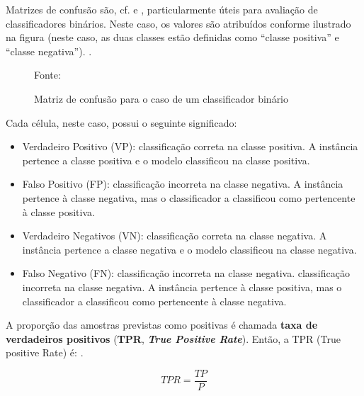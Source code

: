 Matrizes de confusão são, cf.  e , particularmente úteis para avaliação de classificadores binários. Neste caso, os valores são atribuídos conforme ilustrado na figura (neste caso, as duas classes estão definidas como ``classe positiva'' e ``classe negativa''). \cite{hossin_review_2015}.

\begin{figure}[h!]
	\centering
	\caption{Matriz de confusão para o caso de um classificador binário}
	
	{\scriptsize Fonte: }
	\label{fig:binario_matriz_confusao}
\end{figure}

Cada célula, neste caso, possui o seguinte significado:

\begin{itemize}
	\item Verdadeiro Positivo (VP): classificação correta na classe positiva. A instância pertence a classe positiva e o modelo classificou na classe positiva.
	\item Falso Positivo (FP): classificação incorreta na classe negativa. A instância pertence à classe negativa, mas o classificador a classificou como pertencente à classe positiva.
	\item Verdadeiro Negativos (VN): classificação correta na classe negativa. A instância pertence a classe negativa e o modelo classificou na classe negativa.
	\item Falso Negativo (FN): classificação incorreta na classe negativa. classificação incorreta na classe negativa. A instância pertence à classe positiva, mas o classificador a classificou como pertencente à classe negativa. 
\end{itemize}

A proporção das amostras previstas como positivas é chamada \textbf{taxa de verdadeiros positivos} (\textbf{TPR}, \textit{\textbf{True Positive Rate}}). Então, a TPR (True positive Rate) é: \cite{klosterman_projetos_2020} \cite{hossin_review_2015}.

\begin{equation}\label{eq:TPR}
TPR = \frac{TP}{P}
\end{equation}

